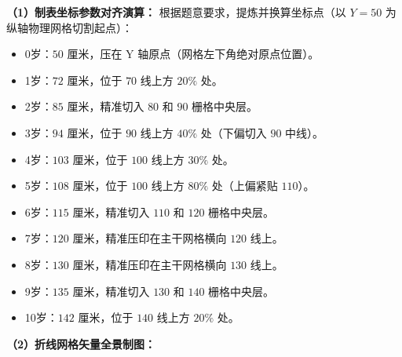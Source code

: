 \documentclass[12pt, a4paper]{ctexrep}
\begin{document}
\textbf{（1）制表坐标参数对齐演算：}
根据题意要求，提炼并换算坐标点（以 $Y=50$ 为纵轴物理网格切割起点）：
\begin{itemize}
    \item 0岁：$50$ 厘米，压在 Y 轴原点（网格左下角绝对原点位置）。
    \item 1岁：$72$ 厘米，位于 $70$ 线上方 $20\%$ 处。
    \item 2岁：$85$ 厘米，精准切入 $80$ 和 $90$ 栅格中央层。
    \item 3岁：$94$ 厘米，位于 $90$ 线上方 $40\%$ 处（下偏切入 $90$ 中线）。
    \item 4岁：$103$ 厘米，位于 $100$ 线上方 $30\%$ 处。
    \item 5岁：$108$ 厘米，位于 $100$ 线上方 $80\%$ 处（上偏紧贴 $110$）。
    \item 6岁：$115$ 厘米，精准切入 $110$ 和 $120$ 栅格中央层。
    \item 7岁：$120$ 厘米，精准压印在主干网格横向 $120$ 线上。
    \item 8岁：$130$ 厘米，精准压印在主干网格横向 $130$ 线上。
    \item 9岁：$135$ 厘米，精准切入 $130$ 和 $140$ 栅格中央层。
    \item 10岁：$142$ 厘米，位于 $140$ 线上方 $20\%$ 处。
\end{itemize}

\textbf{（2）折线网格矢量全景制图：}
\end{document}
